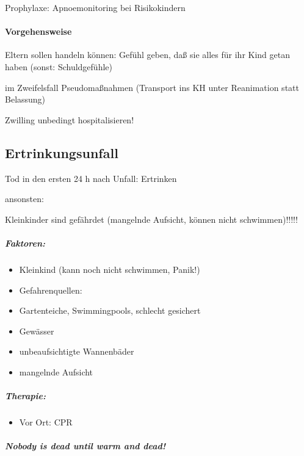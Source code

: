 {\mdseries
Prophylaxe: Apnoemonitoring bei  Risikokindern}

\paragraph{Vorgehensweise}

{\mdseries
Eltern sollen handeln können: Gef\"uhl geben,  da{\ss} sie alles f\"ur
ihr Kind getan haben (sonst:  Schuldgef\"uhle)}

{\mdseries
im Zweifelsfall Pseudoma{\ss}nahmen (Transport  ins KH unter Reanimation
statt Belassung)}

{\mdseries
Zwilling unbedingt hospitalisieren!}

\subsection{Ertrinkungsunfall}

{\mdseries
Tod in den ersten 24 h nach Unfall: Ertrinken}

{\mdseries
ansonsten:
}

{\mdseries
Kleinkinder sind gefährdet (mangelnde  Aufsicht, können nicht
schwimmen)!!!!!}

\subparagraph*{
Faktoren:}

\begin{itemize}
\item {\mdseries
Kleinkind (kann noch nicht schwimmen,  Panik!)}

\item {\mdseries
Gefahrenquellen:}

\item {\mdseries
Gartenteiche, Swimmingpools, schlecht  gesichert}

\item {\mdseries
Gewässer}

\item {\mdseries
unbeaufsichtigte Wannenbäder}

\item {\mdseries
mangelnde Aufsicht}

\end{itemize}
\subparagraph*{
Therapie:}

\begin{itemize}
\item {\mdseries\color[rgb]{0.0,0.0,0.5019608}
Vor Ort: CPR}

\end{itemize}
\subparagraph*{
Nobody is dead until warm and dead!}

